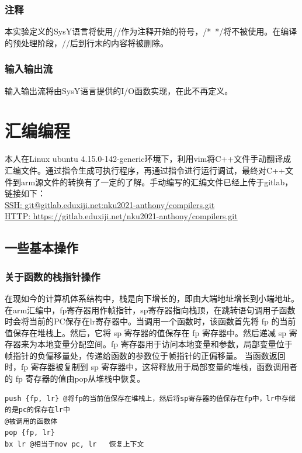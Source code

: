 \documentclass[UTF8,a4paper,10pt]{ctexart}
\begin{document}
\subsubsection{注释}
本实验定义的SysY语言将使用//作为注释开始的符号，/*\ */将不被使用。在编译的预处理阶段，//后到行末的内容将被删除。
\subsubsection{输入输出流}
输入输出流将由SysY语言提供的I/O函数实现，在此不再定义。
\newpage
\section{汇编编程}
本人在Linux ubuntu 4.15.0-142-generic环境下，利用vim将C++文件手动翻译成汇编文件。通过指令生成可执行程序，再通过指令进行运行调试，最终对C++文件到arm源文件的转换有了一定的了解。手动编写的汇编文件已经上传于gitlab，链接如下：\\
\href{git@gitlab.eduxiji.net:nku2021-anthony/compilers.git}{SSH: git@gitlab.eduxiji.net:nku2021-anthony/compilers.git}\\
\href{https://gitlab.eduxiji.net/nku2021-anthony/compilers.git}{HTTP:  https://gitlab.eduxiji.net/nku2021-anthony/compilers.git}
\subsection{一些基本操作}
\subsubsection{关于函数的栈指针操作}
在现如今的计算机体系结构中，栈是向下增长的，即由大端地址增长到小端地址。在arm汇编中，fp寄存器用作帧指针，sp寄存器指向栈顶，在跳转语句调用子函数时会将当前的PC保存在lr寄存器中。当调用一个函数时，该函数首先将 fp 的当前值保存在堆栈上。然后，它将 sp 寄存器的值保存在 fp 寄存器中。然后递减 sp 寄存器来为本地变量分配空间。fp 寄存器用于访问本地变量和参数，局部变量位于帧指针的负偏移量处，传递给函数的参数位于帧指针的正偏移量。
当函数返回时，fp 寄存器被复制到 sp 寄存器中，这将释放用于局部变量的堆栈，函数调用者的 fp 寄存器的值由pop从堆栈中恢复。\cite{zhn}
\begin{lstlisting}[title = 函数被调用时的基本框架]
push {fp, lr} @将fp的当前值保存在堆栈上，然后将sp寄存器的值保存在fp中，lr中存储的是pc的保存在lr中
@被调用的函数体
pop {fp, lr} 
bx lr @相当于mov pc, lr   恢复上下文
\end{lstlisting}
\end{document}
